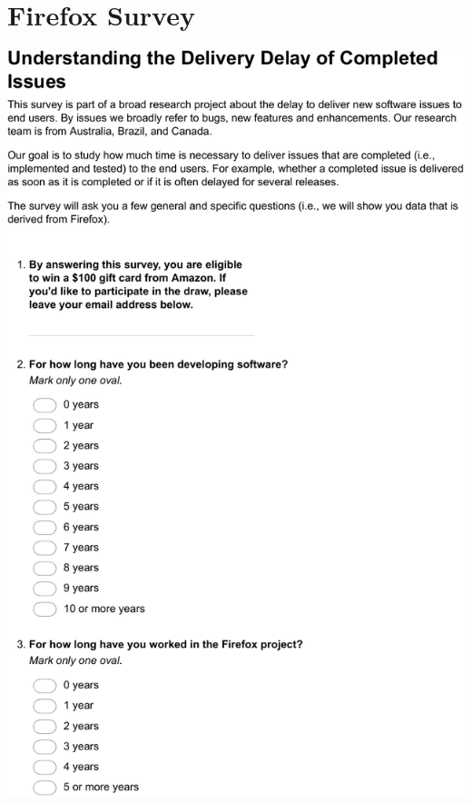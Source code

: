 
\chapter{Firefox Survey}\label{appendix:a}

\includegraphics[width=.9\textwidth]{chapters/chapter5/appendix/Firefox1.pdf}

